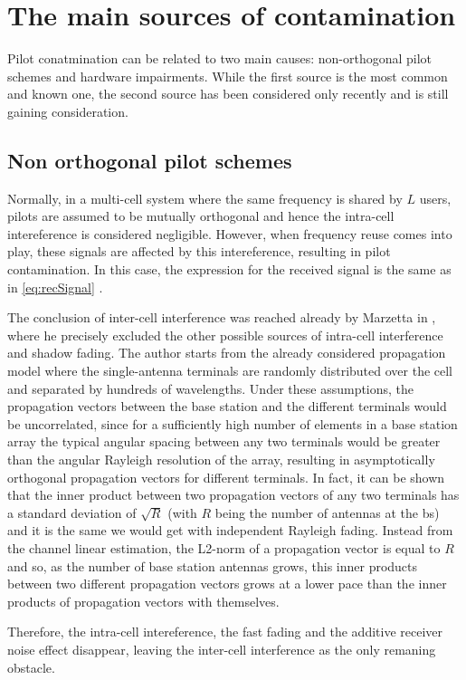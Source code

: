 \documentclass[11pt]{book}
\begin{document}
\section{The main sources of contamination}
Pilot conatmination can be related to two main causes: non-orthogonal pilot schemes and hardware impairments.
While the first source is the most common and known one, the second source has been considered only recently and is still gaining consideration.

\subsection{Non orthogonal pilot schemes}
Normally, in a multi-cell system where the same frequency is shared by $L$ users, pilots are assumed to be mutually orthogonal and hence the intra-cell intereference is considered negligible. However, when frequency reuse comes into play, these signals are affected by this intereference, resulting in pilot contamination. In this case, the expression for the received signal is the same as in \ref{eq:recSignal} \cite{Elijah2016}.

The conclusion of inter-cell interference was reached already by Marzetta in \cite{Marzetta2010}, where he precisely excluded the other possible sources of intra-cell interference and shadow fading. The author starts from the already considered propagation model where the single-antenna terminals are randomly distributed over the cell and separated by hundreds of wavelengths. Under these assumptions, the propagation vectors between the base station and the different terminals would be uncorrelated, since for a sufficiently high number of elements in a base station array the typical angular spacing between any two terminals would be greater than the angular Rayleigh resolution of the array, resulting in asymptotically orthogonal propagation vectors for different terminals. In fact, it can be shown that the inner product between two propagation vectors of any two terminals has a standard deviation of $\sqrt{R}$ (with $R$ being the number of antennas at the \gls{bs}) and it is the same we would get with independent Rayleigh fading. Instead from the channel linear estimation, the L2-norm of a propagation vector is equal to $R$ and so, as the number of base station antennas grows, this inner products between two different propagation vectors grows at a lower pace than the inner products of propagation vectors with themselves.

Therefore, the intra-cell intereference, the fast fading and the additive receiver noise effect disappear, leaving the inter-cell interference as the only remaning obstacle.
\end{document}
